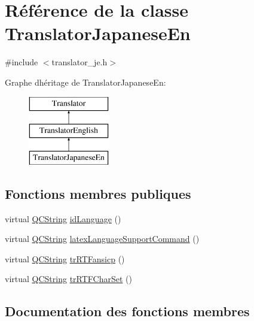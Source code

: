 \hypertarget{class_translator_japanese_en}{}\section{Référence de la classe Translator\+Japanese\+En}
\label{class_translator_japanese_en}


{\ttfamily \#include $<$translator\+\_\+je.\+h$>$}

Graphe d\textquotesingle{}héritage de Translator\+Japanese\+En\+:\begin{figure}[H]
\begin{center}
\leavevmode
\includegraphics[height=3.000000cm]{class_translator_japanese_en}
\end{center}
\end{figure}
\subsection*{Fonctions membres publiques}
\begin{DoxyCompactItemize}
\item 
virtual \hyperlink{class_q_c_string}{Q\+C\+String} \hyperlink{class_translator_japanese_en_a920e7fc0a427b655de47f4085d331099}{id\+Language} ()
\item 
virtual \hyperlink{class_q_c_string}{Q\+C\+String} \hyperlink{class_translator_japanese_en_a82a0008e9f9183374a7581124053ca4f}{latex\+Language\+Support\+Command} ()
\item 
virtual \hyperlink{class_q_c_string}{Q\+C\+String} \hyperlink{class_translator_japanese_en_a4da6df8b58582eb97ffef9f75e070c0f}{tr\+R\+T\+Fansicp} ()
\item 
virtual \hyperlink{class_q_c_string}{Q\+C\+String} \hyperlink{class_translator_japanese_en_aff3e71dc3a1d71f056fea3299c8a427e}{tr\+R\+T\+F\+Char\+Set} ()
\end{DoxyCompactItemize}


\subsection{Documentation des fonctions membres}
\hypertarget{class_translator_japanese_en_a920e7fc0a427b655de47f4085d331099}{}
